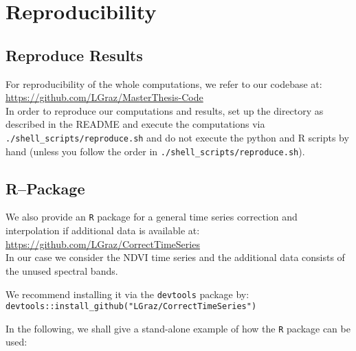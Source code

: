 \chapter{Reproducibility}

\section{Reproduce Results}
For reproducibility of the whole computations, we refer to our codebase at:\\ \url{https://github.com/LGraz/MasterThesis-Code}\\ In order to reproduce our computations and results, set up the directory as described in the README and execute the computations via \texttt{./shell\_scripts/reproduce.sh} and do not execute the python and R scripts by hand (unless you follow the order in \texttt{./shell\_scripts/reproduce.sh}).

\section{R--Package}
We also provide an \texttt{R} package for a general time series correction and interpolation if additional data is available at: \\
\url{https://github.com/LGraz/CorrectTimeSeries} \\
In our case we consider the NDVI time series and the additional data consists of the unused spectral bands.

We recommend installing it via the \texttt{devtools} package by:\\
\texttt{devtools::install\_github("LGraz/CorrectTimeSeries")}

In the following, we shall give a stand-alone example of how the \texttt{R} package can be used:


